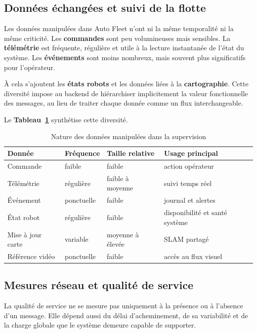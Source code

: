 \documentclass[11pt,a4paper]{report}
\newcommand{\kw}[1]{\textbf{#1}}
\begin{document}
\subsection{Données échangées et suivi de la flotte}

Les données manipulées dans Auto Fleet n’ont ni la même temporalité ni la même criticité. Les \kw{commandes} sont peu volumineuses mais sensibles. La \kw{télémétrie} est fréquente, régulière et utile à la lecture instantanée de l’état du système. Les \kw{événements} sont moins nombreux, mais souvent plus significatifs pour l’opérateur.

À cela s’ajoutent les \kw{états robots} et les données liées à la \kw{cartographie}. Cette diversité impose au backend de hiérarchiser implicitement la valeur fonctionnelle des messages, au lieu de traiter chaque donnée comme un flux interchangeable.

Le \kw{Tableau~\ref{tab:donnees_flotte}} synthétise cette diversité.

\begin{table}[H]
\centering
\small
\renewcommand{\arraystretch}{1.15}
\begin{tabular}{|p{3.1cm}|p{2.4cm}|p{3.8cm}|p{4.6cm}|}
\hline
\textbf{Donnée} & \textbf{Fréquence} & \textbf{Taille relative} & \textbf{Usage principal} \\
\hline
Commande & faible & faible & action opérateur \\
\hline
Télémétrie & régulière & faible à moyenne & suivi temps réel \\
\hline
Événement & ponctuelle & faible & journal et alertes \\
\hline
État robot & régulière & faible & disponibilité et santé système \\
\hline
Mise à jour carte & variable & moyenne à élevée & SLAM partagé \\
\hline
Référence vidéo & ponctuelle & faible & accès au flux visuel \\
\hline
\end{tabular}
\caption{Nature des données manipulées dans la supervision}
\label{tab:donnees_flotte}
\end{table}

\subsection{Mesures réseau et qualité de service}

La qualité de service ne se mesure pas uniquement à la présence ou à l’absence d’un message. Elle dépend aussi du délai d’acheminement, de sa variabilité et de la charge globale que le système demeure capable de supporter.
\end{document}
